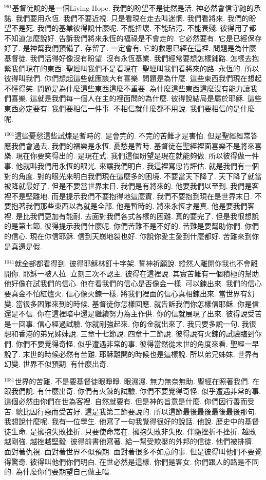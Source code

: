\documentclass{book}
\begin{document}
$^{961}$基督徒說的是一個Living Hope.
我們的盼望不是徒然是活.
神必然會信守祂的承諾.
我們要用永恆.
我們不要近視.
只是看現在走去叫迷惘.
我們看將來.
我們的盼望不是死.
我們的基業彼得說什麼呢.
不能扭壞.
不能玷污.
不能衰殘.
彼得用了都不知道怎麼說好.
告訴我們將來永恆的福祿是不會走的.
它必然要有.
它是已經保存好了.
是神幫我們預備了.
存留了.
一定會有.
它的救恩已經在這裡.
問題是為什麼基督徒.
我們活得好像沒有盼望.
沒有永恆基業.
我們經常要想怎樣鋪路.
怎樣去抱緊我們現在的東西.
聖經叫我們不是看現在.
聖經叫我們看將來的路.
永恆的.
所以彼得叫我們.
你們想起這些就應該大有喜樂.
問題是為什麼.
這些東西我們現在想起不懂得笑.
問題是為什麼這些東西這麼不重要.
為什麼這些東西這麼沒有能力讓我們喜樂.
這就是我們每一個人在主的裡面問的為什麼.
彼得說結局是屬於耶穌.
這些東西必定要有.
我們要相信一件事.
不相信就什麼都不用說.
我們要相信的是什麼呢.

$^{1001}$這些憂愁這些試煉是暫時的.
是會完的.
不完的苦難才是害怕.
但是聖經經常答應我們會過去.
我們的福樂是永恆.
憂愁是暫時.
基督徒在聖經裡面喜樂不是將來喜樂.
現在你要笑得出的.
是現在式.
我們這個盼望是現在就能夠做.
所以彼得做一件事.
他就叫我們用永恆的眼光.
來讓我們明白.
我這裡寫忠肯評估.
就是我們有一個對的角度.
對的眼光來明白我們現在這麼多的困境.
不要當天下降了.
天下降了就當被降就最好了.
但是不要當世界末日.
我們是有將來的.
他要我們以至到.
我們是客裡不是堅離地.
而是提示我們不要抱得地這麼實.
我們不要抱到現在是世界末日.
不要抱著我們那些東西以為就是全部.
他是暫時的.
將來永恆才是真.
他是要我們客裡.
是比我們更加有能耐.
去面對我們各式各樣的困難.
真的要完了.
但是我很想說的是第七節.
彼得提示我們什麼呢.
你們苦難不是不好的.
苦難是要幫助你們.
你們的信心.
現在你信耶穌.
信到天崩地裂也好.
你說你愛主愛到什麼都好.
苦難來到你是真還是假.

$^{1041}$就全部都看得到.
彼得耶穌林釘十字架.
誓神祈願說.
縱然人離開你我也不會離開你.
耶穌一被人拉.
立刻三次不認主.
彼得在這裡說.
其實苦難有一個積極的幫助.
他好像在試我們的信心.
他在看我們的信心是否像金一樣.
可以鍊出來.
我們的信心要真金不怕紅爐火.
信心像火鍊一樣.
將我們裡面的信心真相鍊出來.
當世界有幻變.
當很多困難來到的時候.
基督徒你怎樣回應.
就告訴我們你怎樣信耶穌.
你是信還是不信.
你在這裡暗中還是繼續努力為主作供.
你的信就展現了出來.
彼得說受苦是一回事.
信心經過試驗.
你就剛強起來.
你的金就出來了.
我只要多說一句.
我很想和香港的弟兄姊妹說.
三章十七節說.
四章十二節說.
彼得說有火鍊的試驗臨到你們.
你們不要覺得奇怪.
似乎遭遇非常的事.
彼得當然從末世的角度來看.
聖經一早說了.
末世的時候必然有苦難.
耶穌離開的時候也是這樣說.
所以弟兄姊妹.
世界有幻變.
世界不似預期.
有什麼出奇.

$^{1081}$世界的苦難.
不是要基督徒眼睜睜.
眼濕濕.
無力無奈無助.
聖經在照著我們.
在跟我們說.
有什麼出奇.
你們有火鍊的試驗.
你們不要覺得奇怪.
似乎遭遇非常的事.
這個必然由你們在世為客裡.
自然就要有.
但是神的旨意是什麼.
你們因行善而受苦.
總比因行惡而受苦好.
這是我第二節要說的.
所以這節最後最後最後最後那句.
我想說什麼呢.
我有一位學生.
他寫了一句我覺得很好的說話.
他說.
歷史中的基督徒生命.
是擁抱失敗挫折.
只要使命常在.
擁抱失敗非失敗.
伴隨挫折不挫折.
越敗越剛強.
越挫越堅毅.
彼得前書他寫著.
給一幫受欺壓的外邦的信徒.
他們被排擠.
面對著仇視.
面對著世界不似預期.
面對著很多不如意的事.
但是彼得叫他們不要覺得驚奇.
彼得叫他們你們明白.
在世必然是這樣.
你們是客女.
你們跟人的路是不同的.
為什麼你們要期望自己做主唱.
\end{document}
